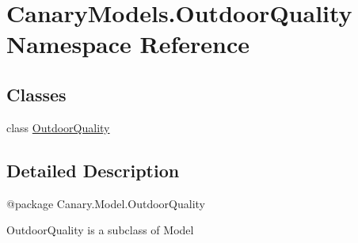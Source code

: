 \hypertarget{namespace_canary_models_1_1_outdoor_quality}{\section{Canary\-Models.\-Outdoor\-Quality Namespace Reference}
\label{namespace_canary_models_1_1_outdoor_quality}
}
\subsection*{Classes}
\begin{DoxyCompactItemize}
\item 
class \hyperlink{class_canary_models_1_1_outdoor_quality_1_1_outdoor_quality}{Outdoor\-Quality}
\end{DoxyCompactItemize}


\subsection{Detailed Description}
\begin{DoxyVerb}@package Canary.Model.OutdoorQuality

OutdoorQuality is a subclass of Model
\end{DoxyVerb}
 